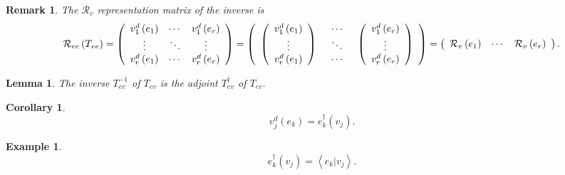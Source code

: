 \documentclass[aps,preprint]{revtex4}%
\newtheorem{corollary}[theorem]{Corollary}
\newtheorem{example}[theorem]{Example}
\newtheorem{lemma}[theorem]{Lemma}
\newtheorem{remark}[theorem]{Remark}
\begin{document}
\begin{remark}
The $\mathcal{R}_{v}$ representation matrix of the inverse is
\begin{equation}
\mathcal{R}_{ee}\left(  T_{ve}\right)  =\left(
\begin{array}
[c]{ccc}%
v_{1}^{d}\left(  e_{1}\right)  & \cdots & v_{1}^{d}\left(  e_{r}\right) \\
\vdots & \ddots & \vdots\\
v_{r}^{d}\left(  e_{1}\right)  & \cdots & v_{r}^{d}\left(  e_{r}\right)
\end{array}
\right)  =\left(
\begin{array}
[c]{ccc}%
\left(
\begin{array}
[c]{c}%
v_{1}^{d}\left(  e_{1}\right) \\
\vdots\\
v_{r}^{d}\left(  e_{1}\right)
\end{array}
\right)  &
\begin{array}
[c]{c}%
\cdots\\
\ddots\\
\cdots
\end{array}
& \left(
\begin{array}
[c]{c}%
v_{1}^{d}\left(  e_{r}\right) \\
\vdots\\
v_{r}^{d}\left(  e_{r}\right)
\end{array}
\right)
\end{array}
\right)  =\left(
\begin{array}
[c]{ccc}%
\mathcal{R}_{v}\left(  e_{1}\right)  & \cdots & \mathcal{R}_{v}\left(
e_{r}\right)
\end{array}
\right)  .
\end{equation}

\end{remark}

\begin{lemma}
The inverse $T_{ev}^{-1}$ of $T_{ev}$ is the adjoint $T_{ev}^{\dagger}$ of
$T_{ev}.$
\end{lemma}

\begin{corollary}%
\begin{equation}
v_{j}^{d}\left(  e_{k}\right)  =e_{k}^{\dagger}\left(  v_{j}\right)  .
\end{equation}

\end{corollary}

\begin{example}%
\begin{equation}
e_{k}^{\dagger}\left(  v_{j}\right)  =\left\langle \left.  e_{k}\right\vert
v_{j}\right\rangle .
\end{equation}

\end{example}
\end{document}
